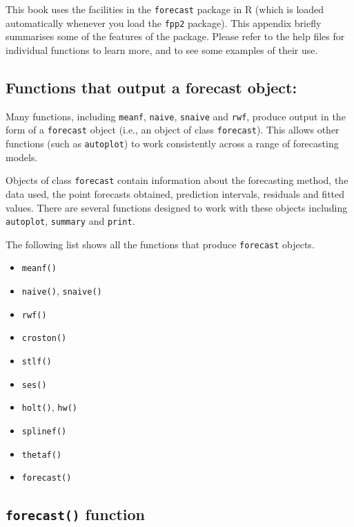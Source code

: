 \documentclass[]{book}
\providecommand{\tightlist}{%
  \setlength{\itemsep}{0pt}\setlength{\parskip}{0pt}}
\begin{document}
This book uses the facilities in the \texttt{forecast} package in R (which is loaded automatically whenever you load the \texttt{fpp2} package). This appendix briefly summarises some of the features of the package. Please refer to the help files for individual functions to learn more, and to see some examples of their use.

\hypertarget{functions-that-output-a-forecast-object}{%
\subsection*{Functions that output a forecast object:}\label{functions-that-output-a-forecast-object}}

Many functions, including \texttt{meanf}, \texttt{naive}, \texttt{snaive} and \texttt{rwf}, produce output in the form of a \texttt{forecast} object (i.e., an object of class \texttt{forecast}). This allows other functions (such as \texttt{autoplot}) to work consistently across a range of forecasting models.

Objects of class \texttt{forecast} contain information about the forecasting method, the data used, the point forecasts obtained, prediction intervals, residuals and fitted values. There are several functions designed to work with these objects including \texttt{autoplot}, \texttt{summary} and \texttt{print}.

The following list shows all the functions that produce \texttt{forecast} objects.

\begin{itemize}
\tightlist
\item
  \texttt{meanf()}
\item
  \texttt{naive()}, \texttt{snaive()}
\item
  \texttt{rwf()}
\item
  \texttt{croston()}
\item
  \texttt{stlf()}
\item
  \texttt{ses()}
\item
  \texttt{holt()}, \texttt{hw()}
\item
  \texttt{splinef()}
\item
  \texttt{thetaf()}
\item
  \texttt{forecast()}
\end{itemize}

\hypertarget{forecast-function}{%
\subsection*{\texorpdfstring{\texttt{forecast()} function}{forecast() function}}\label{forecast-function}}
\end{document}
